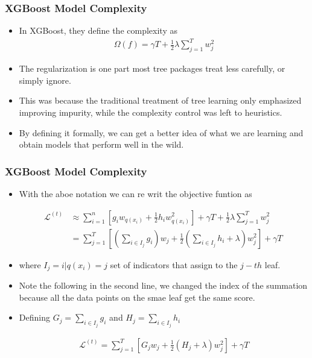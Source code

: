 \documentclass[
  shownotes,
  xcolor={svgnames},
  hyperref={colorlinks,citecolor=DarkBlue,linkcolor=DarkRed,urlcolor=DarkBlue}
  , aspectratio=169]{beamer}
\begin{document}
\begin{frame}[fragile]
\frametitle{XGBoost Model Complexity}

\begin{itemize}
\item In XGBoost, they define the complexity as
\begin{align}
\Omega(f) = \gamma T + \frac{1}{2}\lambda \sum_{j=1}^T w_j^2
\end{align}




\item The regularization is one part most tree packages treat less carefully, or simply ignore. 
\medskip 
\item This was because the traditional treatment of tree learning only emphasized improving impurity, while the complexity control was left to heuristics.
\medskip 
\item  By defining it formally, we can get a better idea of what we are learning and obtain models that perform well in the wild.

\end{itemize}
 \end{frame}

\begin{frame}[fragile]
\frametitle{XGBoost Model Complexity}

\begin{itemize}
\item With the aboe notation we can re writ the objective funtion as 


\begin{align}
\mathcal{L}^{(t)} &\approx \sum_{i=1}^n [g_i w_{q(x_i)} + \frac{1}{2} h_i w_{q(x_i)}^2] + \gamma T + \frac{1}{2}\lambda \sum_{j=1}^T w_j^2\\
&= \sum^T_{j=1} [(\sum_{i\in I_j} g_i) w_j + \frac{1}{2} (\sum_{i\in I_j} h_i + \lambda) w_j^2 ] + \gamma T\
\end{align}

\item where $I_j={i|q(x_i)=j}$ set of indicators that assign to the $j-th$ leaf.
\item Note the following in the second line, we changed the index of the summation because all the data points on the smae leaf get the same score.
\item Defining $G_j = \sum_{i\in I_j} g_i$ and $H_j = \sum_{i\in I_j} h_i$

\begin{align}
\mathcal{L}^{(t)} = \sum^T_{j=1} [G_jw_j + \frac{1}{2} (H_j+\lambda) w_j^2] +\gamma T
\end{align}

\end{itemize}

\end{frame}
\end{document}

